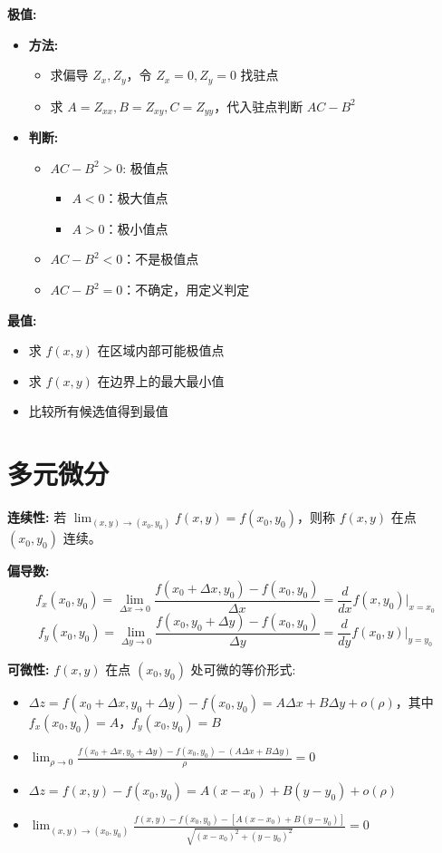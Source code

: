 \documentclass[10pt]{article}
\begin{document}
\begin{multicols*}{2}
\textbf{极值:}
\begin{itemize}
  \item \textbf{方法:}
    \begin{itemize}
      \item 求偏导 \(Z_x, Z_y\)，令 \(Z_x = 0, Z_y = 0\) 找驻点
      \item 求 \(A = Z_{xx}, B = Z_{xy}, C = Z_{yy}\)，代入驻点判断 \(AC - B^2\)
    \end{itemize}
  \item \textbf{判断:}
    \begin{itemize}
      \item \(AC - B^2 > 0\): 极值点
        \begin{itemize}
          \item \(A < 0\)：极大值点
          \item \(A > 0\)：极小值点
        \end{itemize}
      \item \(AC - B^2 < 0\)：不是极值点
      \item \(AC - B^2 = 0\)：不确定，用定义判定
    \end{itemize}
\end{itemize}

\textbf{最值:}
\begin{itemize}
  \item 求 \(f(x,y)\) 在区域内部可能极值点
  \item 求 \(f(x,y)\) 在边界上的最大最小值
  \item 比较所有候选值得到最值
\end{itemize}


\section*{多元微分}

\textbf{连续性:} 若 \(\lim_{(x,y) \to (x_0,y_0)} f(x,y) = f(x_0,y_0)\)，则称 \(f(x,y)\) 在点 \((x_0,y_0)\) 连续。

\textbf{偏导数:}
\[
f_x(x_0,y_0) = \lim_{\Delta x \to 0} \frac{f(x_0 + \Delta x,y_0) - f(x_0,y_0)}{\Delta x} = \frac{d}{dx} f(x,y_0)\bigg|_{x=x_0}
\]
\[
f_y(x_0,y_0) = \lim_{\Delta y \to 0} \frac{f(x_0,y_0 + \Delta y) - f(x_0,y_0)}{\Delta y} = \frac{d}{dy} f(x_0,y)\bigg|_{y=y_0}
\]

\textbf{可微性:} \(f(x,y)\) 在点 \((x_0,y_0)\) 处可微的等价形式:
\begin{itemize}
  \item \(\Delta z = f(x_0 + \Delta x,y_0 + \Delta y) - f(x_0,y_0) = A \Delta x + B \Delta y + o(\rho)\)，其中 \(f_x(x_0,y_0) = A\)，\(f_y(x_0,y_0) = B\)
  \item \(\lim_{\rho \to 0} \frac{f(x_0 + \Delta x,y_0 + \Delta y) - f(x_0,y_0) - (A \Delta x + B \Delta y)}{\rho} = 0\)
  \item \(\Delta z = f(x,y) - f(x_0,y_0) = A(x - x_0) + B(y - y_0) + o(\rho)\)
  \item \(\lim_{(x,y) \to (x_0,y_0)} \frac{f(x,y) - f(x_0,y_0) - [A(x - x_0) + B(y - y_0)]}{\sqrt{(x - x_0)^2 + (y - y_0)^2}} = 0\)
\end{itemize}


\end{multicols*}
\end{document}
